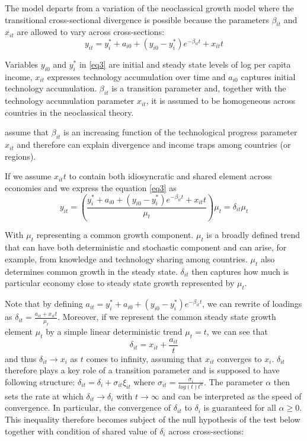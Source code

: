 \documentclass[11pt]{article}
\begin{document}
The model departs from a variation of the neoclassical growth model where the transitional cross-sectional divergence is possible because the parameters $\beta_{it}$ and $x_{it}$ are allowed to vary across cross-sections:
\begin{equation} \label{eq3}
 y_{it} = y_i^* + a_{i0} + (y_{i0} - y_i^*)e^{-\beta_{it}t} + x_{it}t 
\end{equation}

 Variables $y_{i0}$ and $y_{i}^{*}$ in \eqref{eq3} are initial and steady state levels of log per capita income, $x_{it}$ expresses technology accumulation over time and $a_{i0}$ captures initial technology accumulation. $\beta_{it}$ is a transition parameter and, together with the technology accumulation parameter $x_{it}$, it is assumed to be homogeneous across countries in the neoclassical theory.

\citeauthor{phillips2007transition} assume that $\beta_{it}$ is an increasing function of the technological progress parameter $x_{it}$ and therefore can explain divergence and income traps among countries (or regions).

If we assume $x_{it}t$ to contain both idiosyncratic and shared element across economies and we express the equation \eqref{eq3} as
\begin{equation} \label{eq4} y_{it} = (\frac{ y_i^* + a_{i0} + (y_{i0} - y_i^*)e^{-\beta_{it}t} + x_{it}t}{\mu_t})\mu_t = \delta_{it}\mu_t  \end{equation}

With $\mu_t$ representing a common growth component.
$\mu_t$ is a broadly defined trend that can have both deterministic and stochastic component and can arise, for example, from knowledge and technology sharing among countries. $\mu_t$ also determines common growth in the steady state. $\delta_{it}$ then captures how much is particular economy close to steady state growth represented by $\mu_t$.

Note that by defining \(a_{it} = y_i^* + a_{i0} + (y_{i0} - y_i^*)e^{-\beta_{it}t} \), we can rewrite of loadings as \(\delta_{it} = \frac{a_{it} + x_{it}t}{\mu_t}\). Moreover, if we represent the common steady state growth element $\mu_t$ by a simple linear deterministic trend \(\mu_t = t\), we can see that
\begin{equation} \label{eq5}\delta_{it} = x_{it} + \frac{a_{it}}{t} \end{equation}  and thus \(\delta_{it} \rightarrow x_i\) as $t$ comes to infinity, assuming that $x_{it}$ converges to $x_{i}$. $\delta_{it}$ therefore plays a key role of a transition parameter and is supposed to have following structure: \(\delta_{it} = \delta_{i} + \sigma_{it}\xi_{it}\) where \( \sigma_{it} = \frac{\sigma_{i}}{log(t)t^\alpha}\). The parameter $\alpha$ then sets the rate at which \(\delta_{it} \rightarrow \delta_{i}\) with \(t \rightarrow \infty\) and can be interpreted as the speed of convergence. In particular, the convergence of $\delta_{it}$ to $\delta_{i}$ is guaranteed for all \(\alpha \geq 0\). This inequality therefore becomes subject of the null hypothesis of the test below together with condition of shared value of $\delta_{i}$ across cross-sections: 
\end{document}
